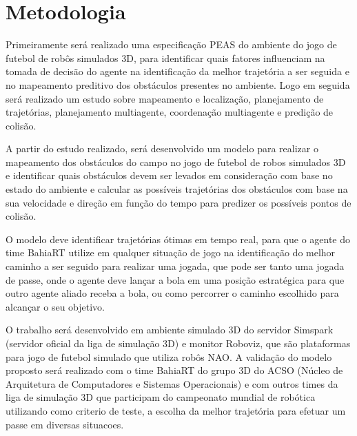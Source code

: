
\chapter{Metodologia}
\label{chap:metodo}

Primeiramente será realizado uma especificação PEAS \cite{brussel} do ambiente do jogo de futebol de robôs simulados 3D, para identificar quais fatores influenciam na 
tomada de decisão do agente na identificação da melhor trajetória a ser seguida e no mapeamento preditivo dos obstáculos presentes no ambiente. Logo em seguida será 
realizado um estudo sobre mapeamento e localização, planejamento de trajetórias, planejamento multiagente, coordenação multiagente e predição de colisão. 

A partir do estudo realizado, será desenvolvido um modelo para realizar o mapeamento dos obstáculos do campo no jogo de futebol de robos simulados 3D e identificar quais obstáculos 
devem ser levados em consideração com base no estado do ambiente e calcular as possíveis trajetórias dos obstáculos com base na sua velocidade
e direção em função do tempo para predizer os possíveis pontos de colisão.

O modelo deve identificar trajetórias ótimas em tempo real, para que o agente do time BahiaRT utilize em qualquer situação de jogo na identificação do melhor caminho a ser 
seguido para realizar uma jogada, que pode ser tanto uma jogada de passe, onde o agente deve lançar a bola em uma posição estratégica para que outro agente aliado receba a bola, 
ou como percorrer o caminho escolhido para alcançar o seu objetivo.

O trabalho será desenvolvido em ambiente simulado 3D do servidor Simspark (servidor oficial da liga de simulação 3D) e monitor Roboviz,
que são plataformas para jogo de futebol simulado que utiliza robôs NAO. A validação do modelo proposto será realizado com o time 
BahiaRT do grupo 3D do ACSO (Núcleo de Arquitetura de Computadores e Sistemas Operacionais) e com outros times da liga de simulação 3D
que participam do campeonato mundial de robótica utilizando como criterio de teste, a escolha da melhor trajetória para efetuar um passe em diversas situacoes.